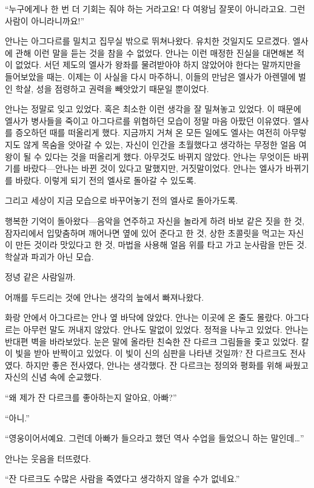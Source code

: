 ``누구에게나 한 번 더 기회는 줘야 하는 거라고요! 다 여왕님 잘못이 아니라고요. 그런 사람이 아니라니까요!''

안나는 아그다르를 밀치고 집무실 밖으로 뛰쳐나왔다. 유치한 것일지도 모르겠다. 엘사에 관해 이런 말을 듣는 것을 참을 수 없었다. 안나는 이런 매정한 진실을 대면해본 적이 없었다. 서던 제도의 엘사가 왕좌를 물려받아야 하지 않았어야 한다는 말까지만을 들어보았을 때는. 이제는 이 사실을 다시 마주하니, 이들의 만남은 엘사가 아렌델에 벌인 학살, 성을 점령하고 권력을 빼앗았기 때문일 뿐이었다.

안나는 정말로 잊고 있었다. 혹은 최소한 이런 생각을 잘 밀쳐놓고 있었다. 이 때문에 엘사가 병사들을 죽이고 아그다르를 위협하던 모습이 정말 마음 아팠던 이유였다. 엘사를 증오하던 때를 떠올리게 했다. 지금까지 거쳐 온 모든 일에도 엘사는 여전히 아무렇지도 않게 목숨을 앗아갈 수 있는, 자신이 인간을 초월했다고 생각하는 무정한 얼음 여왕이 될 수 있다는 것을 떠올리게 했다. 아무것도 바뀌지 않았다. 안나는 무엇이든 바뀌기를 바랐다—안나는 바뀐 것이 있다고 말했지만, 거짓말이었다. 안나는 엘사가 바뀌기를 바랐다. 이렇게 되기 전의 엘사로 돌아갈 수 있도록.

그리고 세상이 지금 모습으로 바꾸어놓기 전의 엘사로 돌아가도록.

행복한 기억이 돌아왔다—음악을 연주하고 자신을 놀라게 하려 바보 같은 짓을 한 것, 잠자리에서 입맞춤하며 깨어나면 옆에 있어 준다고 한 것, 상한 초콜릿을 먹고는 자신이 만든 것이라 맛있다고 한 것, 마법을 사용해 얼음 위를 타고 가고 눈사람을 만든 것. 학살과 파괴가 아닌 모습.

정녕 같은 사람일까.

어깨를 두드리는 것에 안나는 생각의 늪에서 빠져나왔다.

화랑 안에서 아그다르는 안나 옆 바닥에 앉았다. 안나는 이곳에 온 줄도 몰랐다. 아그다르는 아무런 말도 꺼내지 않았다. 안나도 말없이 있었다. 정적을 나누고 있었다. 안나는 반대편 벽을 바라보았다. 눈은 말에 올라탄 친숙한 잔 다르크 그림들을 좇고 있었다. 칼이 빛을 받아 반짝이고 있었다. 이 빛이 신의 심판을 나타낸 것일까? 잔 다르크도 전사였다. 하지만 좋은 전사였다, 안나는 생각했다. 잔 다르크는 정의와 평화를 위해 싸웠고 자신의 신념 속에 순교했다.

``왜 제가 잔 다르크를 좋아하는지 알아요, 아빠?''

``아니.''

``영웅이어서예요. 그런데 아빠가 들으라고 했던 역사 수업을 들었으니 하는 말인데\ldots''

안나는 웃음을 터뜨렸다.

``잔 다르크도 수많은 사람을 죽였다고 생각하지 않을 수가 없네요.''


